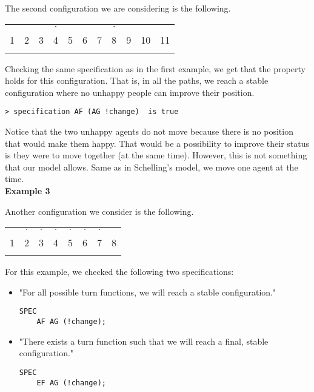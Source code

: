 \documentclass[../main.tex]{subfiles}
\begin{document}
The second configuration we are considering is the following.
\begin{table}[H]
\begin{center}
{\begin{tabular}{| c |c| c| c| c |c| c |c| c |c |c |}
\hline
 & &  & $\cdot$ & & &  &  $\cdot$ &  & &  \\
1 & 2 &3 &4 &5 &6  &7 &8 & 9 & 10 &11\\
\z & \z &\z &\x &\z &\z  &\z &\x &\z &\z &\z  \\
 \hline
\end{tabular}}
\end{center}
\end{table}


 Checking the same specification as in the first example, we get that the property holds for this configuration. That is, in all the paths, we reach a stable configuration where no unhappy people can improve their position.

 \begin{lstlisting}
> specification AF (AG !change)  is true
 \end{lstlisting}
Notice that the two unhappy agents do not move because there is no position that would make them happy. That would be a possibility to improve their status is they were to move together (at the same time). However, this is not something that our model allows. Same as in Schelling's model, we move one agent at the time.\\

\textbf{Example 3}

Another configuration we consider is the following.

\begin{table}[H]
\begin{center}
{\begin{tabular}{| c |c| c| c| c |c| c |c| }
\hline
 &  $\cdot$&  $\cdot$ &  $\cdot$ & $\cdot$ & $\cdot$ &  $\cdot$ &  \\
1 & 2 &3 &4 &5 &6  &7 &8\\
\x & \x &\z &\z &\x &\x  &\z &\z  \\
 \hline
\end{tabular}}
\end{center}
\end{table}

For this example, we checked the following two specifications:
\begin{itemize}
    \item "For all possible turn functions, we will reach a stable configuration."
\begin{lstlisting}
SPEC
    AF AG (!change);
 \end{lstlisting}
 
    \item "There exists a turn function such that we will reach a final, stable configuration."
\begin{lstlisting}
SPEC
    EF AG (!change);
 \end{lstlisting}
\end{itemize}
\end{document}
